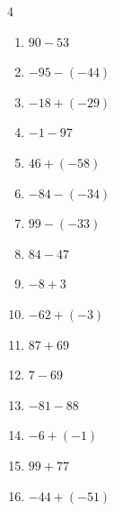 \begin{multicols}{4}
\begin{enumerate}
        \phantom{$=6$}

  \item $90-53$

        \phantom{$=37$}

  \item $-95-(-44)$

        \phantom{$=-51$}

  \item $-18+(-29)$

        \phantom{$=-47$}

\columnbreak %

  \item $-1-97$

        \phantom{$=-98$}

  \item $46+(-58)$

        \phantom{$=-12$}

  \item $-84-(-34)$

        \phantom{$=-50$}

  \item $99-(-33)$

        \phantom{$=132$}

  \item $84-47$

        \phantom{$=37$}

  \item $-8+3$

        \phantom{$=-5$}

  \item $-62+(-3)$

        \phantom{$=-65$}

  \item $87+69$

        \phantom{$=156$}

  \item $7-69$

        \phantom{$=-62$}

  \item $-81-88$

        \phantom{$=-169$}

  \item $-6+(-1)$

        \phantom{$=-7$}

  \item $99+77$

        \phantom{$=176$}

  \item $-44+(-51)$


\end{enumerate}
\end{multicols}
